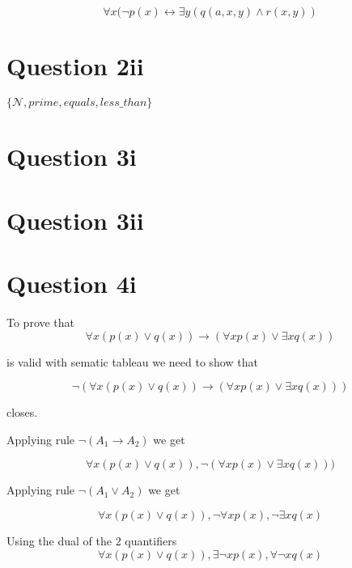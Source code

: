 \documentclass[10pt,a4paper]{article}
\begin{document}
\begin{equation}
 \forall x(\neg p(x) \leftrightarrow \exists y(q(a,x,y) \wedge r(x,y))
\end{equation}

\section{Question 2ii}
$\{\mathscr{N},prime,equals,less\_than\}$


\section{Question 3i}



\section{Question 3ii}


\section{Question 4i}

To prove that 
\begin{equation}
 \forall x(p(x)\vee q(x)) \rightarrow (\forall x p(x)\vee\exists x q(x))
\end{equation}

is valid with sematic tableau we need to show that 

\begin{equation}
 \neg (\forall x(p(x)\vee q(x)) \rightarrow (\forall x p(x)\vee\exists x q(x)))
\end{equation}

closes. 

Applying rule $\neg(A_1\rightarrow A_2)$ we get

\begin{equation}
 \forall x(p(x)\vee q(x)),\neg(\forall x p(x)\vee\exists x q(x)))
\end{equation}

Applying rule $\neg(A_1 \vee A_2)$ we get

\begin{equation}
 \forall x(p(x)\vee q(x)),\neg\forall xp(x),\neg\exists xq(x)
\end{equation}

Using the dual of the 2 quantifiers
\
\begin{equation}
 \forall x(p(x)\vee q(x)),\exists\neg xp(x),\forall\neg xq(x)
\end{equation}
\end{document}
